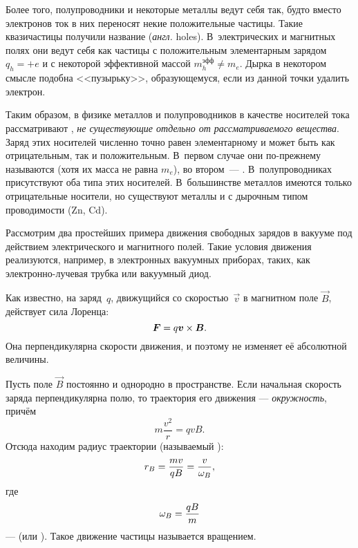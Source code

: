 Более того, полупроводники и некоторые металлы
ведут себя так, будто вместо электронов ток в них переносят некие
положительные частицы. Такие квазичастицы получили название 
(\emph{англ.} holes).
В~электрических и магнитных полях они ведут себя как частицы с положительным
элементарным зарядом $q_h=+e$ и с некоторой эффективной массой
$m_h^{эфф}\ne m_e$. Дырка в некотором смысле подобна <<пузырьку>>, образующемуся,
если из данной точки удалить электрон.

Таким образом, в физике металлов и полупроводников в качестве носителей тока
рассматривают ,
\emph{не существующие отдельно от рассматриваемого вещества}.
Заряд этих носителей численно точно равен элементарному и может быть как
отрицательным, так и положительным. В~первом случае они по-прежнему называются
 (хотя их масса не равна $m_e$),
во втором~--- \mbox{}. В~полупроводниках присутствуют оба типа этих
носителей. В~большинстве металлов имеются только отрицательные носители, но
существуют металлы и с дырочным типом проводимости (Zn, Cd).


\label{sec:freemotion}

Рассмотрим два простейших примера движения свободных зарядов в вакууме под
действием электрического и магнитного полей. Такие условия движения реализуются,
например, в электронных вакуумных приборах, таких, как электронно-лучевая
трубка или вакуумный диод.


Как известно, на заряд~$q$, движущийся со скоростью~$\vec{v}$ в магнитном поле
$\vec{B}$, действует сила Лоренца:
\begin{equation*}
    \eqmark{3.1}
    \vec{F}=q{\vec{v}}\times{\vec{B}}.
\end{equation*}
Она перпендикулярна скорости движения, и поэтому не изменяет её абсолютной величины. 

Пусть поле $\vec{B}$ постоянно и однородно в пространстве.
Если начальная скорость заряда перпендикулярна полю, то траектория
его движения --- \emph{окружность}, причём
\[
m\frac{v^2}{r}=qvB.
\]
Отсюда находим радиус траектории (называемый ):
\begin{equation}
    \eqmark{3.2}
    r_B =\frac{m v}{qB}= \frac{v}{\omega_B},
\end{equation}
где
\begin{equation}
\eqmark{omega-B}
\omega_B=\frac{qB}{m}
\end{equation}
---  (или ).
Такое движение частицы называется  вращением.

